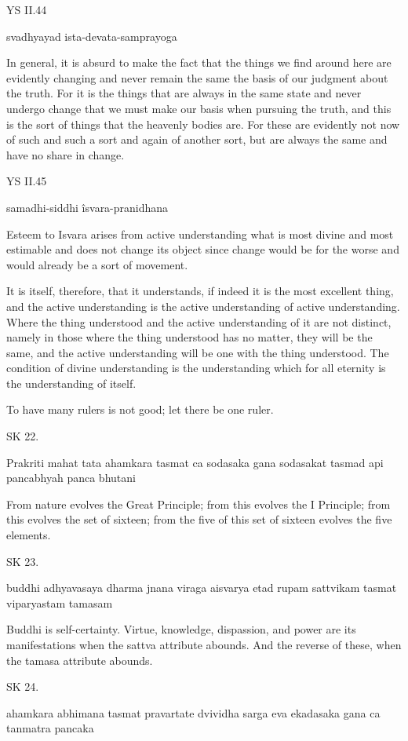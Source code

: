 YS II.44

    svadhyayad ista-devata-samprayoga

In general, it is absurd to make the fact that the things
we find around here are evidently changing and never remain the same
the basis of our judgment about the truth. For it is the things that
are always in the same state and never undergo change that we must make
our basis when pursuing the truth, and this is the sort of things that
the heavenly bodies are. For these are evidently not now of such and such 
a sort and again of another sort, but are always the same and have no share in
change.

YS II.45

    samadhi-siddhi îsvara-pranidhana

Esteem to Isvara arises from active understanding what is most divine
and most estimable and does not change its object since change would be for the worse
and would already be a sort of movement.

It is itself, therefore, that it understands, if indeed it is the most excellent thing,
and the active understanding is the active understanding of active understanding.
Where the thing understood and the active understanding of it are not distinct,
namely in those where the thing understood has no matter, they will be the same,
and the active understanding will be one with the thing understood.
The condition of divine understanding is the understanding 
which for all eternity is the understanding of itself.

To have many rulers is not good; let there be one ruler.

SK 22.

Prakriti mahat tata ahamkara tasmat ca sodasaka gana
sodasakat tasmad api pancabhyah panca bhutani

From nature evolves the Great Principle;
from this evolves the I Principle;
from this evolves the set of sixteen;
from the five of this set of sixteen evolves the five elements.

SK 23.

buddhi adhyavasaya dharma jnana viraga aisvarya
etad rupam sattvikam tasmat viparyastam tamasam

Buddhi is self-certainty.
Virtue, knowledge, dispassion, and power are its manifestations
when the sattva attribute abounds.
And the reverse of these, when the tamasa attribute abounds.

SK 24.

ahamkara abhimana tasmat pravartate dvividha sarga eva
ekadasaka gana ca tanmatra pancaka

